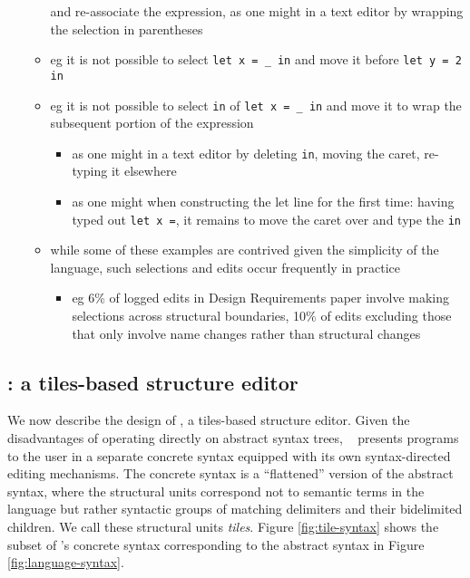 \begin{itemize}
\begin{itemize}
      and re-associate the expression, as one might in a text editor by
      wrapping the selection in parentheses
    \item eg it is not possible to select \texttt{let x = \_ in} and
      move it before \texttt{let y = 2 in}
    \item eg it is not possible to select \texttt{in} of \texttt{let x = \_ in}
      and move it to wrap the subsequent portion of the expression
    \begin{itemize}
      \item as one might in a text editor by deleting \texttt{in},
        moving the caret, re-typing it elsewhere
      \item as one might when constructing the let line for the first time:
        having typed out \texttt{let x =}, it remains to move the caret over
        and type the \texttt{in}
    \end{itemize}
    \item while some of these examples are contrived given the simplicity of
      the language, such selections and edits occur frequently in practice
    \begin{itemize}
      \item eg 6\% of logged edits in Design Requirements
        paper involve making
        selections across structural boundaries, 10\% of edits excluding those
        that only involve name changes rather than structural changes
    \end{itemize}
  \end{itemize}
\end{itemize}

\subsection{\tylr: a tiles-based structure editor}

We now describe the design of \tylr, a tiles-based structure
editor.
Given the disadvantages of operating directly on abstract syntax
trees, \tylr~ presents programs to the user in a separate
concrete syntax equipped with its own syntax-directed editing
mechanisms.
The concrete syntax is a ``flattened'' version of the abstract
syntax, where the structural units correspond not to semantic
terms in the language but rather syntactic groups of matching
delimiters and their bidelimited children.
We call these structural units \emph{tiles}.
Figure \ref{fig:tile-syntax} shows the subset of \tylr's
concrete syntax corresponding to the abstract syntax in
Figure \ref{fig:language-syntax}.

